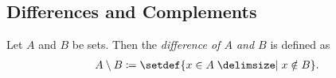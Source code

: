 

\subsection{Differences and Complements}

\begin{definition}
    Let $A$ and $B$ be sets. Then the \emph{difference of $A$ and $B$} is defined as \begin{align}A\setminus B\coloneq\setdef{x\in A\given x\notin B}.\end{align}
\end{definition}

